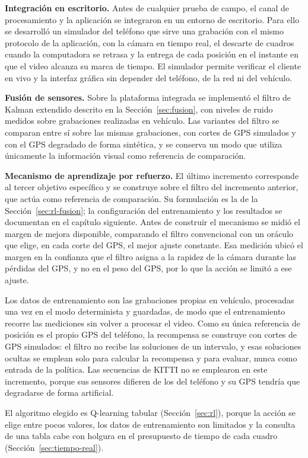 \textbf{Integración en escritorio.}
Antes de cualquier prueba de campo, el canal de procesamiento y la aplicación se integraron en un entorno de escritorio.
Para ello se desarrolló un simulador del teléfono que sirve una grabación con el mismo protocolo de la aplicación, con la cámara en tiempo real, el descarte de cuadros cuando la computadora se retrasa y la entrega de cada posición en el instante en que el video alcanza su marca de tiempo.
El simulador permite verificar el cliente en vivo y la interfaz gráfica sin depender del teléfono, de la red ni del vehículo.

\textbf{Fusión de sensores.}
Sobre la plataforma integrada se implementó el filtro de Kalman extendido descrito en la Sección~\ref{sec:fusion}, con niveles de ruido medidos sobre grabaciones realizadas en vehículo.
Las variantes del filtro se comparan entre sí sobre las mismas grabaciones, con cortes de GPS simulados y con el GPS degradado de forma sintética, y se conserva un modo que utiliza únicamente la información visual como referencia de comparación.

\textbf{Mecanismo de aprendizaje por refuerzo.}
El último incremento corresponde al tercer objetivo específico y se construye sobre el filtro del incremento anterior, que actúa como referencia de comparación.
Su formulación es la de la Sección~\ref{sec:rl-fusion}; la configuración del entrenamiento y los resultados se documentan en el capítulo siguiente.
Antes de construir el mecanismo se midió el margen de mejora disponible, comparando el filtro convencional con un oráculo que elige, en cada corte del GPS, el mejor ajuste constante.
Esa medición ubicó el margen en la confianza que el filtro asigna a la rapidez de la cámara durante las pérdidas del GPS, y no en el peso del GPS, por lo que la acción se limitó a ese ajuste.

Los datos de entrenamiento son las grabaciones propias en vehículo, procesadas una vez en el modo determinista y guardadas, de modo que el entrenamiento recorre las mediciones sin volver a procesar el video.
Como su única referencia de posición es el propio GPS del teléfono, la recompensa se construye con cortes de GPS simulados: el filtro no recibe las soluciones de un intervalo, y esas soluciones ocultas se emplean solo para calcular la recompensa y para evaluar, nunca como entrada de la política.
Las secuencias de KITTI no se emplearon en este incremento, porque sus sensores difieren de los del teléfono y su GPS tendría que degradarse de forma artificial.

El algoritmo elegido es Q-learning tabular (Sección~\ref{sec:rl}), porque la acción se elige entre pocos valores, los datos de entrenamiento son limitados y la consulta de una tabla cabe con holgura en el presupuesto de tiempo de cada cuadro (Sección~\ref{sec:tiempo-real}).

